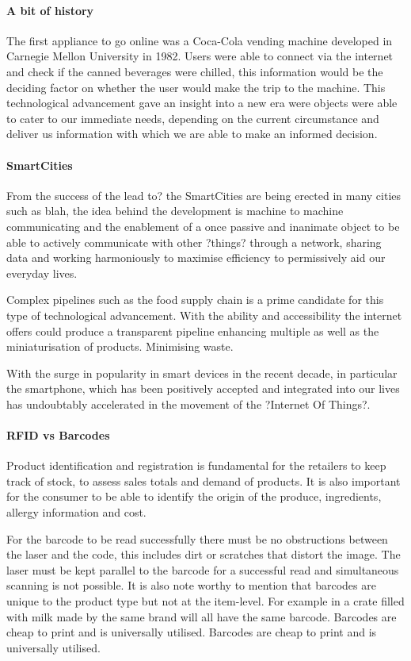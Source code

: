 \documentclass[a4paper, 11pt]{article}
\begin{document}
\paragraph{A bit of history} The first appliance to go online was a Coca-Cola vending machine developed in Carnegie Mellon University in 1982. Users were able to connect via the internet and check if the canned beverages were chilled, this information would be the deciding factor on whether the user would make the trip to the machine. This technological advancement gave an insight into a new era were objects were able to cater to our immediate needs, depending on the current circumstance and deliver us information with which we are able to make an informed decision.

\paragraph{SmartCities} From the success of the lead to?  the SmartCities are being erected in many cities such as blah, the idea behind the development is machine to machine communicating and the enablement of a once passive and inanimate object to be able to actively communicate with other ?things? through a network, sharing data and working harmoniously to maximise efficiency to permissively aid our everyday lives. 

Complex pipelines such as the food supply chain is a prime candidate for this type of technological advancement. With the ability and accessibility the internet offers could produce a transparent pipeline enhancing multiple as well as the miniaturisation of products. Minimising waste.

With the surge in popularity in smart devices in the recent decade, in particular the smartphone, which has been positively accepted and integrated into our lives has undoubtably accelerated in the movement of the ?Internet Of Things?. 

\paragraph{RFID vs Barcodes}
Product identification and registration is fundamental for the retailers to keep track of stock, to assess sales totals and demand of products. It is also important for the consumer to be able to identify the origin of the produce, ingredients, allergy information and cost. 

For the barcode to be read successfully there must be no obstructions between the laser and the code, this includes dirt or scratches that distort the image. The laser must be kept parallel to the barcode for a successful read and simultaneous scanning is not possible. It is also note worthy to mention that barcodes are unique to the product type but not at the item-level. For example in a crate filled with milk made by the same brand will all have the same barcode. Barcodes are cheap to print and is universally utilised. Barcodes are cheap to print and is universally utilised.
\end{document}

